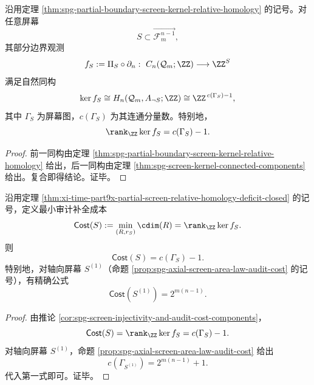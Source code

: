 \begin{theorem}[部分屏幕观测的相对同调赤字闭式]\label{thm:xi-time-part9x-partial-screen-relative-homology-deficit-closed}
沿用定理 \ref{thm:spg-partial-boundary-screen-kernel-relative-homology} 的记号。对任意屏幕
\[
S\subset \overrightarrow{\mathcal F_{m}^{n-1}},
\]
其部分边界观测
\[
f_S:=\Pi_S\circ\partial_n:\ C_n(\mathcal Q_m;\ZZ)\longrightarrow \ZZ^S
\]
满足自然同构
\[
\ker f_S\cong H_n(\mathcal Q_m,A_{\neg S};\ZZ)\cong \ZZ^{\,c(\Gamma_S)-1},
\]
其中 \(\Gamma_S\) 为屏幕图，\(c(\Gamma_S)\) 为其连通分量数。特别地，
\[
\rank_{\ZZ}\ker f_S=c(\Gamma_S)-1.
\]
\end{theorem}
\begin{proof}
前一同构由定理 \ref{thm:spg-partial-boundary-screen-kernel-relative-homology} 给出，后一同构由定理 \ref{thm:spg-screen-kernel-connected-components} 给出。复合即得结论。证毕。
\end{proof}

\begin{corollary}\label{cor:xi-time-part9x-screen-completion-cost-sharp-area-law}
沿用定理 \ref{thm:xi-time-part9x-partial-screen-relative-homology-deficit-closed} 的记号，定义最小审计补全成本
\[
\mathsf{Cost}(S):=\min_{(R,r_S)}\cdim(R)=\rank_{\ZZ}\ker f_S.
\]
则
\[
\mathsf{Cost}(S)=c(\Gamma_S)-1.
\]
特别地，对轴向屏幕 \(S^{(1)}\)（命题 \ref{prop:spg-axial-screen-area-law-audit-cost} 的记号），有精确公式
\[
\mathsf{Cost}(S^{(1)})=2^{m(n-1)}.
\]
\end{corollary}
\begin{proof}
由推论 \ref{cor:spg-screen-injectivity-and-audit-cost-components}，
\[
\mathsf{Cost}(S)=\rank_{\ZZ}\ker f_S=c(\Gamma_S)-1.
\]
对轴向屏幕 \(S^{(1)}\)，命题 \ref{prop:spg-axial-screen-area-law-audit-cost} 给出
\[
c(\Gamma_{S^{(1)}})=2^{m(n-1)}+1.
\]
代入第一式即可。证毕。
\end{proof}

